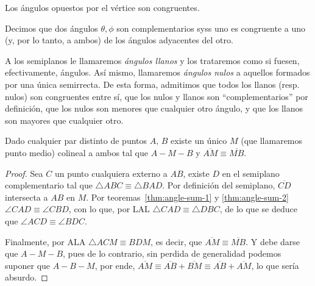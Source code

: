 \documentclass[11pt,a4paper]{book}
\begin{document}
\begin{cor}
Los ángulos opuestos por el vértice son congruentes.
\end{cor}
\begin{mydef}
Decimos que dos ángulos $\theta,\phi$ son complementarios syss uno es congruente a uno (y, por lo tanto, a ambos) de los ángulos adyacentes del otro.
\end{mydef}
\begin{mydef}
A los semiplanos le llamaremos \textit{ángulos llanos} y los trataremos como si fuesen, efectivamente, ángulos. Así mismo, llamaremos \textit{ángulos nulos} a aquellos formados por una única semirrecta. De esta forma, admitimos que todos los llanos (resp. nulos) son congruentes entre sí, que los nulos y llanos son ``complementarios'' por definición, que los nulos son menores que cualquier otro ángulo, y que los llanos son mayores que cualquier otro.
\end{mydef}
\begin{thm}
Dado cualquier par distinto de puntos $A,\,B$ existe un único $M$ (que llamaremos punto medio) colineal a ambos tal que $A-M-B$ y $\overline{AM}\equiv\overline{MB}$.
\end{thm}
\begin{proof}
Sea $C$ un punto cualquiera externo a $AB$, existe $D$ en el semiplano complementario tal que $\triangle ABC\equiv\triangle BAD$. Por definición del semiplano, $\overline{CD}$ intersecta a $AB$ en $M$. Por teoremas~\ref{thm:angle-sum-1} y \ref{thm:angle-sum-2} $\angle CAD\equiv\angle CBD$, con lo que, por LAL $\triangle CAD\equiv\triangle DBC$, de lo que se deduce que $\angle ACD\equiv\angle BDC$.
\begin{figure}
\centering
{}
\end{figure}

Finalmente, por ALA $\triangle ACM\equiv BDM$, es decir, que $\overline{AM}\equiv\overline{MB}$. Y debe darse que $A-M-B$, pues de lo contrario, sin perdida de generalidad podemos suponer que $A-B-M$, por ende, $\overline{AM}\equiv\overline{AB}+\overline{BM}\equiv\overline{AB}+\overline{AM}$, lo que sería absurdo.
\end{proof}
\end{document}
